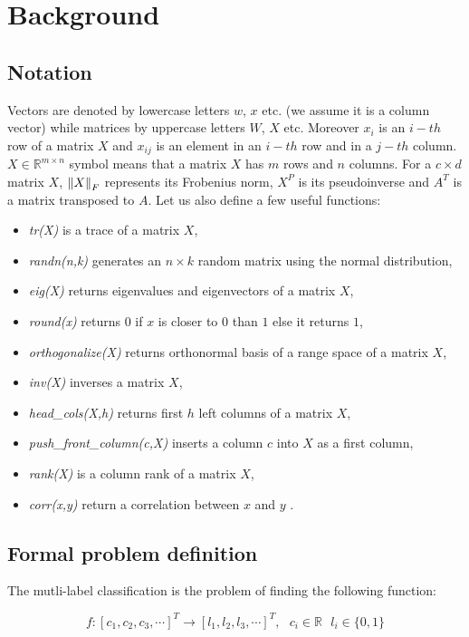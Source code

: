 
\chapter{Background}
\section{Notation}

Vectors are denoted by lowercase letters $w$, $x$ etc. (we assume it is a column vector) while matrices by uppercase letters $W$, $X$ etc. Moreover $x_i$ is an $i-th$ row of a matrix $X$ and $x_{ij}$ is an element in an $i-th$ row and in a $j-th$ column. $X \in \mathbb{R}^{m \times n}$ symbol means that a matrix $X$ has $m$ rows and $n$ columns. For a $c \times d$  matrix $X$, $\left\lVert X\right\rVert_{F}$ represents its Frobenius norm, $X^P$ is its pseudoinverse and $A^T$ is a matrix transposed to $A$. 
Let us also define a few useful functions:
\begin{itemize}
\item \textit{tr(X)} is a trace of a matrix $X$, 
\item \textit{randn(n,k)} generates an $n \times k$ random matrix using the normal distribution,
\item \textit{eig(X)} returns eigenvalues and eigenvectors of a matrix $X$,
\item \textit{round(x)} returns $0$ if $x$ is closer to $0$ than $1$ else it returns $1$,
\item \textit{orthogonalize(X)} returns orthonormal basis of a range space of a matrix $X$,
\item \textit{inv(X)} inverses a matrix $X$,
\item \textit{head\_cols(X,h)} returns first $h$ left columns of a matrix $X$,
\item \textit{push\_front\_column(c,X)} inserts a column $c$ into $X$ as a first column,
\item \textit{rank(X)} is a column rank of a matrix $X$,
\item \textit{corr(x,y)} return a correlation between $x$ and $y$ . 

\end{itemize}

\section{Formal problem definition}
The mutli-label classification is the problem of finding the following function: 

\begin{equation}\label{eq:def}
    f: [c_1, c_2, c_3, \cdots]^T \rightarrow [l_1, l_2, l_3, \cdots]^T, \text{ } c_i \in \mathbb{R} \text{ } l_i \in \{0,1\} 
\end{equation}

